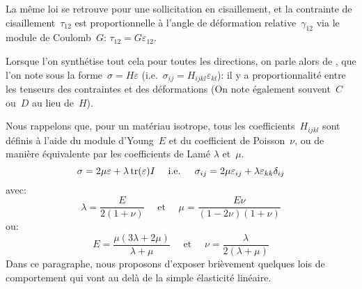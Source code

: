 La même loi se retrouve pour une sollicitation en cisaillement, et la contrainte de cisaillement~$\tau_{12}$
est proportionnelle à l'angle de déformation relative~$\gamma_{12}$ via le module de
Coulomb~$G$:
$\tau_{12}=G\varepsilon_{12}$.

Lorsque l'on synthétise tout cela pour toutes les directions, on parle alors de ,
que l'on note sous la forme~$\sigma=H\varepsilon$ (i.e.~$\sigma_{ij}=H_{ijkl}\varepsilon_{kl}$):
il y a proportionnalité entre les tenseurs des contraintes et des déformations (On note également
souvent~$C$ ou~$D$ au lieu de~$H$).

\medskip
Nous rappelons que, pour un matériau isotrope, tous les coefficients~$H_{ijkl}$ sont définis
à l'aide du module d'Young~$E$
et du coefficient de Poisson~$\nu$,
ou de manière équivalente par les coefficients de Lamé
$\lambda$ et~$\mu$.
\begin{equation}\sigma = 2\mu\varepsilon+\lambda \operatorname{tr}(\varepsilon)I \quad \text{ i.e. } \quad
\sigma_{ij}=2\mu\varepsilon_{ij}+\lambda\varepsilon_{kk}\delta_{ij}\end{equation}
avec:
\begin{equation}\lambda=\dfrac{E}{2(1+\nu)} \quad \text{ et } \quad \mu=\dfrac{E\nu}{(1-2\nu)(1+\nu)} \end{equation}
ou:
\begin{equation}E=\dfrac{\mu(3\lambda+2\mu)}{\lambda+\mu} \quad\text{ et }\quad
\nu=\dfrac{\lambda}{2(\lambda+\mu)} \end{equation}
\medskipvm
Dans ce paragraphe, nous proposons d'exposer brièvement quelques lois de
comportement qui vont au delà de la simple élasticité linéaire.


\medskip
